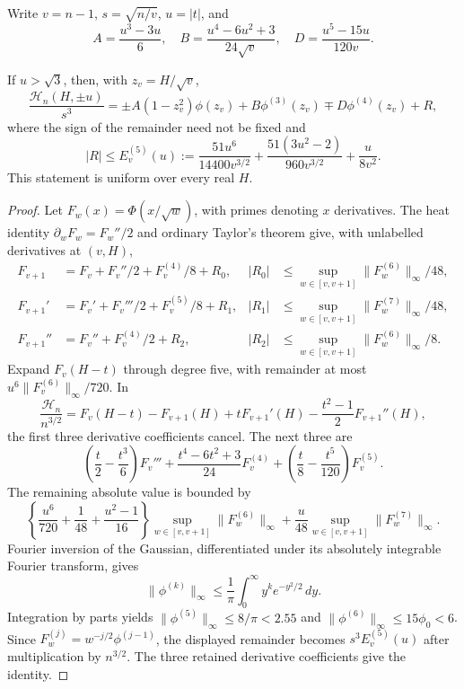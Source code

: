 Write $v=n-1$, $s=\sqrt{n/v}$, $u=|t|$, and
\[
 A=\frac{u^3-3u}{6},\quad B=\frac{u^4-6u^2+3}{24\sqrt v},
 \quad D=\frac{u^5-15u}{120v}.
\]
\begin{lemma}
\label{ms:legacy-support:fifth}
If $u>\sqrt3$, then, with $z_v=H/\sqrt v$,
\[
 \frac{\mathcal H_n(H,\pm u)}{s^3}
 =\pm A(1-z_v^2)\phi(z_v)+B\phi^{(3)}(z_v)
                  \mp D\phi^{(4)}(z_v)+R,
\]
where the sign of the remainder need not be fixed and
\[
 |R|\le E^{(5)}_v(u):=
 \frac{51u^6}{14400v^{3/2}}
 +\frac{51(3u^2-2)}{960v^{3/2}}+\frac{u}{8v^2}.
\]
This statement is uniform over every real $H$.
\end{lemma}
\begin{proof}
Let $F_w(x)=\Phi(x/\sqrt w)$, with primes denoting $x$ derivatives.
The heat identity $\partial_w F_w=F_w''/2$ and ordinary Taylor's theorem
give, with unlabelled derivatives at $(v,H)$,
\begin{align*}
 F_{v+1}&=F_v+F_v''/2+F_v^{(4)}/8+R_0,
 &|R_0|&\le\sup_{w\in[v,v+1]}\|F_w^{(6)}\|_\infty/48,\\
 F_{v+1}'&=F_v'+F_v'''/2+F_v^{(5)}/8+R_1,
 &|R_1|&\le\sup_{w\in[v,v+1]}\|F_w^{(7)}\|_\infty/48,\\
 F_{v+1}''&=F_v''+F_v^{(4)}/2+R_2,
 &|R_2|&\le\sup_{w\in[v,v+1]}\|F_w^{(6)}\|_\infty/8.
\end{align*}
Expand $F_v(H-t)$ through degree five, with remainder at most
$u^6\|F_v^{(6)}\|_\infty/720$. In
\[
 \frac{\mathcal H_n}{n^{3/2}}=
 F_v(H-t)-F_{v+1}(H)+tF_{v+1}'(H)
             -\frac{t^2-1}{2}F_{v+1}''(H),
\]
the first three derivative coefficients cancel. The next three are
\[
 \left(\frac t2-\frac{t^3}6\right)F_v'''
 +\frac{t^4-6t^2+3}{24}F_v^{(4)}
 +\left(\frac t8-\frac{t^5}{120}\right)F_v^{(5)}.
\]
The remaining absolute value is bounded by
\[
 \left\{\frac{u^6}{720}+\frac1{48}+\frac{u^2-1}{16}\right\}
       \sup_{w\in[v,v+1]}\|F_w^{(6)}\|_\infty
 +\frac u{48}\sup_{w\in[v,v+1]}\|F_w^{(7)}\|_\infty.
\]
Fourier inversion of the Gaussian, differentiated under its absolutely
integrable Fourier transform, gives
\[
 \|\phi^{(k)}\|_\infty
 \le\frac1\pi\int_0^\infty y^k e^{-y^2/2}\,dy.
\]
Integration by parts yields
$\|\phi^{(5)}\|_\infty\le8/\pi<2.55$ and
$\|\phi^{(6)}\|_\infty\le15\phi_0<6$.
Since $F_w^{(j)}=w^{-j/2}\phi^{(j-1)}$, the displayed remainder
becomes $s^3E^{(5)}_v(u)$ after multiplication by $n^{3/2}$.
The three retained derivative coefficients give the identity.
\end{proof}

